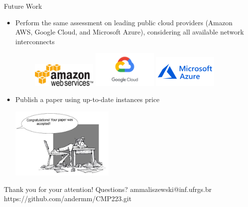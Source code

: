 \documentclass{beamer}
\begin{document}
\begin{frame}[t]{Future Work}
\begin{itemize}
    \item Perform the same assessment on leading public cloud providers (Amazon AWS, Google Cloud, and Microsoft Azure), considering all available network interconnects
   \begin{figure}
   \includegraphics[width=0.3\textwidth]{SLIDES/logo/amazon.png}
   \hfill
   \includegraphics[width=0.3\textwidth]{SLIDES/logo/Google_logo.png}
   \hfill
   \includegraphics[width=0.3\textwidth]{SLIDES/logo/Azure_logo.png}
\end{figure}
    \pause\item Publish a paper using up-to-date \alert{instances price}
    \begin{center}
        \includegraphics[width=0.4\textwidth]{SLIDES/logo/Publishing.png}
    \end{center}
\end{itemize}
\end{frame}
\logo{}

\begin{frame}{}
\begin{center}
\Huge{Thank you for your attention! Questions?}
\vfill
\Large{ammaliszewski@inf.ufrgs.br}
\vfill
\small{https://github.com/andermm/CMP223.git}
\end{center}
\end{frame}
\end{document}
